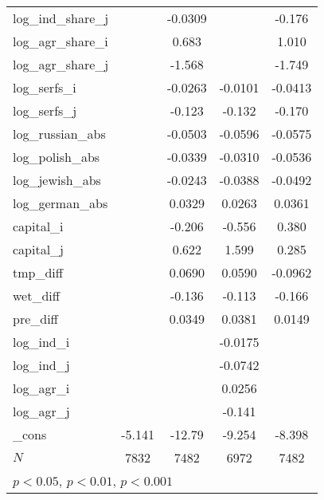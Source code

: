 {\begin{longtable}{l*{4}{c}}
log\_ind\_share\_j&                     &     -0.0309         &                     &      -0.176         \\
log\_agr\_share\_i&                     &       0.683\sym{*}  &                     &       1.010\sym{**} \\
log\_agr\_share\_j&                     &      -1.568\sym{***}&                     &      -1.749\sym{***}\\
log\_serfs\_i &                     &     -0.0263         &     -0.0101         &     -0.0413         \\
log\_serfs\_j &                     &      -0.123\sym{***}&      -0.132\sym{***}&      -0.170\sym{***}\\
log\_russian\_abs&                     &     -0.0503\sym{**} &     -0.0596\sym{**} &     -0.0575\sym{**} \\
log\_polish\_abs&                     &     -0.0339         &     -0.0310         &     -0.0536\sym{*}  \\
log\_jewish\_abs&                     &     -0.0243         &     -0.0388         &     -0.0492         \\
log\_german\_abs&                     &      0.0329         &      0.0263         &      0.0361         \\
capital\_i   &                     &      -0.206         &      -0.556\sym{**} &       0.380         \\
capital\_j   &                     &       0.622\sym{**} &       1.599\sym{***}&       0.285         \\
tmp\_diff    &                     &      0.0690\sym{***}&      0.0590\sym{***}&     -0.0962\sym{***}\\
wet\_diff    &                     &      -0.136\sym{***}&      -0.113\sym{***}&      -0.166\sym{***}\\
pre\_diff    &                     &      0.0349\sym{***}&      0.0381\sym{***}&      0.0149\sym{***}\\
log\_ind\_i   &                     &                     &     -0.0175         &                     \\
log\_ind\_j   &                     &                     &     -0.0742         &                     \\
log\_agr\_i   &                     &                     &      0.0256         &                     \\
log\_agr\_j   &                     &                     &      -0.141\sym{***}&                     \\
\_cons      &      -5.141\sym{***}&      -12.79\sym{***}&      -9.254\sym{***}&      -8.398\sym{***}\\
\hline
\(N\)       &        7832         &        7482         &        6972         &        7482         \\
\hline\hline
\multicolumn{5}{l}{\footnotesize \sym{*} \(p<0.05\), \sym{**} \(p<0.01\), \sym{***} \(p<0.001\)}\\
\end{longtable}
}
